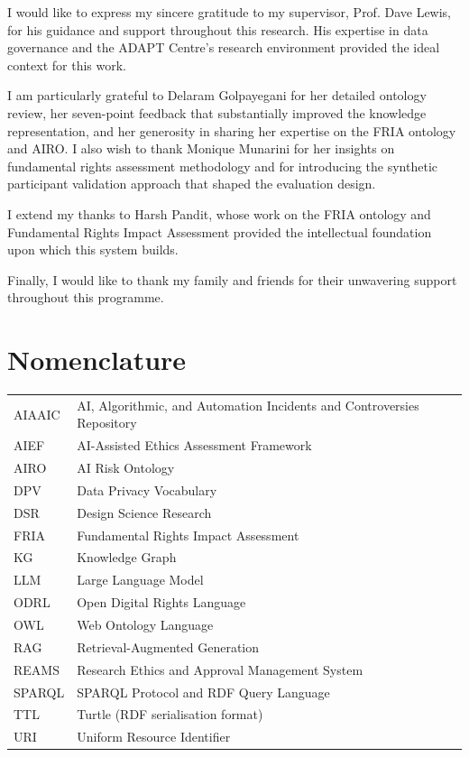 \documentclass[a4paper,oneside,12pt]{book}
\numberwithin{equation}{chapter}
\begin{document}
I would like to express my sincere gratitude to my supervisor, Prof. Dave Lewis, for his guidance and support throughout this research. His expertise in data governance and the ADAPT Centre's research environment provided the ideal context for this work.

I am particularly grateful to Delaram Golpayegani for her detailed ontology review, her seven-point feedback that substantially improved the knowledge representation, and her generosity in sharing her expertise on the FRIA ontology and AIRO. I also wish to thank Monique Munarini for her insights on fundamental rights assessment methodology and for introducing the synthetic participant validation approach that shaped the evaluation design.

I extend my thanks to Harsh Pandit, whose work on the FRIA ontology and Fundamental Rights Impact Assessment provided the intellectual foundation upon which this system builds.

Finally, I would like to thank my family and friends for their unwavering support throughout this programme.


\tableofcontents
\listoffigures
\listoftables

\newpage
\section*{\Huge\textcolor{tcd_blue}{Nomenclature}}
\begin{tabular}{lp{10cm}}
AIAAIC & AI, Algorithmic, and Automation Incidents and Controversies Repository \\
AIEF & AI-Assisted Ethics Assessment Framework \\
AIRO & AI Risk Ontology \\
DPV & Data Privacy Vocabulary \\
DSR & Design Science Research \\
FRIA & Fundamental Rights Impact Assessment \\
KG & Knowledge Graph \\
LLM & Large Language Model \\
ODRL & Open Digital Rights Language \\
OWL & Web Ontology Language \\
RAG & Retrieval-Augmented Generation \\
REAMS & Research Ethics and Approval Management System \\
SPARQL & SPARQL Protocol and RDF Query Language \\
TTL & Turtle (RDF serialisation format) \\
URI & Uniform Resource Identifier \\
\end{tabular}

\mainmatter









\appendix
\renewcommand{\thechapter}{A\arabic{chapter}}

\end{document}
